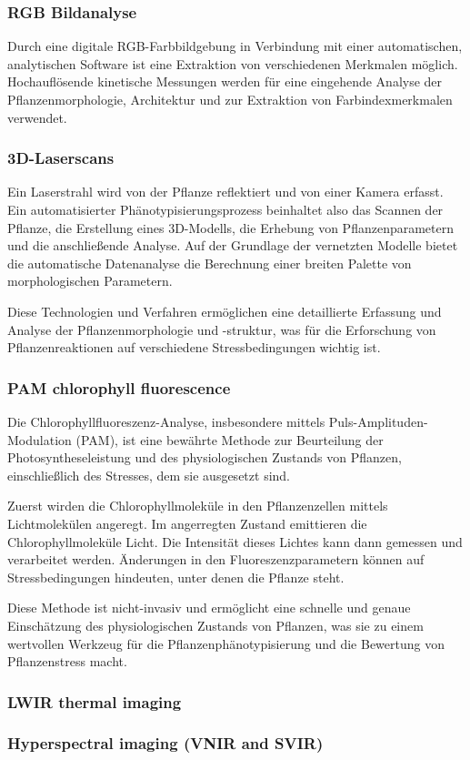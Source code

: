 \subsubsection{RGB Bildanalyse}
Durch eine digitale RGB-Farbbildgebung in Verbindung mit einer automatischen, analytischen Software ist eine Extraktion von verschiedenen Merkmalen möglich. Hochauflösende kinetische Messungen werden für eine eingehende Analyse der Pflanzenmorphologie, Architektur und zur Extraktion von Farbindexmerkmalen verwendet.

\subsubsection{3D-Laserscans}
 Ein Laserstrahl wird von der Pflanze reflektiert und von einer Kamera erfasst. Ein automatisierter Phänotypisierungsprozess beinhaltet also das Scannen der Pflanze, die Erstellung eines 3D-Modells, die Erhebung von Pflanzenparametern und die anschließende Analyse. Auf der Grundlage der vernetzten Modelle bietet die automatische Datenanalyse die Berechnung einer breiten Palette von morphologischen Parametern.\cite{vandenberghe2018make}

Diese Technologien und Verfahren ermöglichen eine detaillierte Erfassung und Analyse der Pflanzenmorphologie und -struktur, was für die Erforschung von Pflanzenreaktionen auf verschiedene Stressbedingungen wichtig ist.

\subsubsection{PAM chlorophyll fluorescence}
Die Chlorophyllfluoreszenz-Analyse, insbesondere mittels Puls-Amplituden-Modulation (PAM), ist eine bewährte Methode zur Beurteilung der Photosyntheseleistung und des physiologischen Zustands von Pflanzen, einschließlich des Stresses, dem sie ausgesetzt sind.

Zuerst wirden die Chlorophyllmoleküle in den Pflanzenzellen mittels Lichtmolekülen angeregt. Im angerregten Zustand emittieren die Chlorophyllmoleküle Licht. Die Intensität dieses Lichtes kann dann gemessen und verarbeitet werden.
Änderungen in den Fluoreszenzparametern können auf Stressbedingungen hindeuten, unter denen die Pflanze steht.

Diese Methode ist nicht-invasiv und ermöglicht eine schnelle und genaue Einschätzung des physiologischen Zustands von Pflanzen, was sie zu einem wertvollen Werkzeug für die Pflanzenphänotypisierung und die Bewertung von Pflanzenstress macht.

\subsubsection{LWIR thermal imaging}

\subsubsection{Hyperspectral imaging (VNIR and SVIR)}
